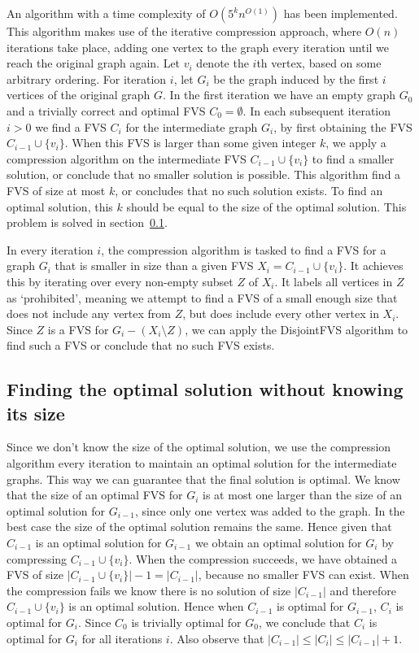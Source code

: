 
An algorithm with a time complexity of $O(5^kn^{O(1)})$ has been implemented. This algorithm makes use of the iterative compression approach, where $O(n)$ iterations take place, adding one vertex to the graph every iteration until we reach the original graph again. Let $v_i$ denote the $i$th vertex, based on some arbitrary ordering. For iteration $i$, let $G_i$ be the graph induced by the first $i$ vertices of the original graph $G$. In the first iteration we have an empty graph $G_0$ and a trivially correct and optimal FVS $C_0 = \emptyset$. In each subsequent iteration $i>0$ we find a FVS $C_i$ for the intermediate graph $G_i$, by first obtaining the FVS $C_{i-1} \cup \{v_i\}$. When this FVS is larger than some given integer $k$, we apply a compression algorithm on the intermediate FVS $C_{i-1} \cup \{v_i\}$ to find a smaller solution, or conclude that no smaller solution is possible. This algorithm find a FVS of size at most $k$, or concludes that no such solution exists. To find an optimal solution, this $k$ should be equal to the size of the optimal solution. This problem is solved in section~\ref{sec:noK}.

In every iteration $i$, the compression algorithm is tasked to find a FVS for a graph $G_i$ that is smaller in size than a given FVS $X_i = C_{i-1} \cup \{v_i\}$. It achieves this by iterating over every non-empty subset $Z$ of $X_i$. It labels all vertices in $Z$ as `prohibited', meaning we attempt to find a FVS of a small enough size that does not include any vertex from $Z$, but does include every other vertex in $X_i$. Since $Z$ is a FVS for $G_i-(X_i\setminus Z)$, we can apply the {\sc DisjointFVS} algorithm  to find such a FVS or conclude that no such FVS exists.

\subsection{Finding the optimal solution without knowing its size}
\label{sec:noK}
Since we don't know the size of the optimal solution, we use the compression algorithm every iteration to maintain an optimal solution for the intermediate graphs. This way we can guarantee that the final solution is optimal. We know that the size of an optimal FVS for $G_i$ is at most one larger than the size of an optimal solution for $G_{i-1}$, since only one vertex was added to the graph. In the best case the size of the optimal solution remains the same. Hence given that $C_{i-1}$ is an optimal solution for $G_{i-1}$ we obtain an optimal solution for $G_i$ by compressing $C_{i-1} \cup \{v_i\}$. When the compression succeeds, we have obtained a FVS of size $|C_{i-1} \cup \{v_i\}|-1 = |C_{i-1}|$, because no smaller FVS can exist. When the compression fails we know there is no solution of size $|C_{i-1}|$ and therefore $C_{i-1} \cup \{v_i\}$ is an optimal solution. Hence when $C_{i-1}$ is optimal for $G_{i-1}$, $C_i$ is optimal for $G_i$. Since $C_0$ is trivially optimal for $G_0$, we conclude that $C_i$ is optimal for $G_i$ for all iterations $i$. Also observe that $|C_{i-1}| \leq |C_i| \leq |C_{i-1}|+1$.

